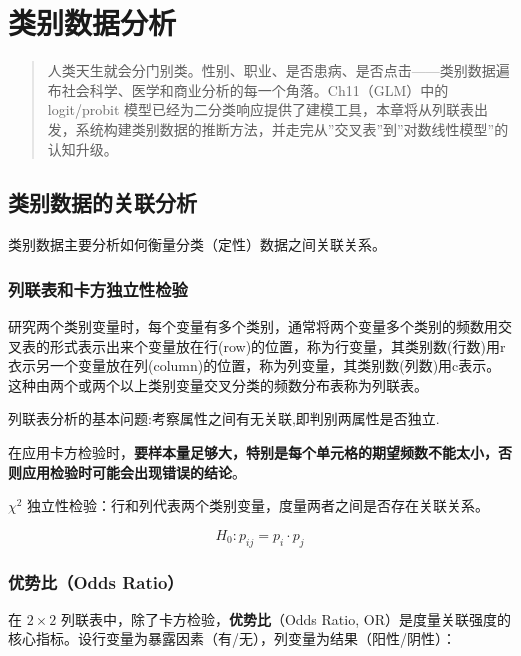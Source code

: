 \documentclass[
]{book}
\begin{document}
\chapter{类别数据分析}\label{ux7c7bux522bux6570ux636eux5206ux6790}

\begin{quote}
人类天生就会分门别类。性别、职业、是否患病、是否点击------类别数据遍布社会科学、医学和商业分析的每一个角落。Ch11（GLM）中的 logit/probit 模型已经为二分类响应提供了建模工具，本章将从列联表出发，系统构建类别数据的推断方法，并走完从''交叉表''到''对数线性模型''的认知升级。
\end{quote}

\section{类别数据的关联分析}\label{ux7c7bux522bux6570ux636eux7684ux5173ux8054ux5206ux6790}

类别数据主要分析如何衡量分类（定性）数据之间关联关系。

\subsection{列联表和卡方独立性检验}\label{ux5217ux8054ux8868ux548cux5361ux65b9ux72ecux7acbux6027ux68c0ux9a8c}

研究两个类别变量时，每个变量有多个类别，通常将两个变量多个类别的频数用交叉表的形式表示出来个变量放在行(row)的位置，称为行变量，其类别数(行数)用r衣示另一个变量放在列(column)的位置，称为列变量，其类别数(列数)用c表示。这种由两个或两个以上类别变量交叉分类的频数分布表称为列联表。

列联表分析的基本问题:考察属性之间有无关联,即判别两属性是否独立.

在应用卡方检验时，\textbf{要样本量足够大，特别是每个单元格的期望频数不能太小，否则应用检验时可能会出现错误的结论}。

\(\chi^2\) 独立性检验：行和列代表两个类别变量，度量两者之间是否存在关联关系。

\[
H_0:p_{ij} = p_i\cdot p_j
\]

\subsection{优势比（Odds Ratio）}\label{ux4f18ux52bfux6bd4odds-ratio}

在 \(2 \times 2\) 列联表中，除了卡方检验，\textbf{优势比}（Odds Ratio, OR）是度量关联强度的核心指标。设行变量为暴露因素（有/无），列变量为结果（阳性/阴性）：
\end{document}
